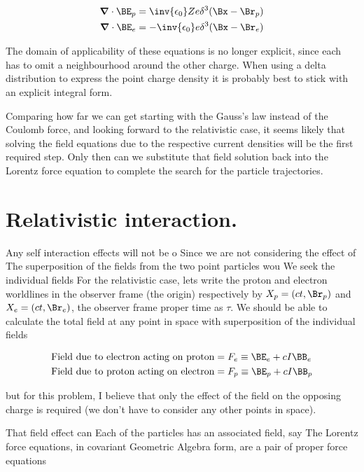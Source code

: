 \begin{align}\label{eqn:nuclearInteraction:boo6}
\spacegrad \cdot \BE_p &= \inv{\epsilon_0} Z e \delta^3(\Bx - \Br_p) \\
\spacegrad \cdot \BE_e &= -\inv{\epsilon_0} e \delta^3(\Bx - \Br_e) 
\end{align}

The domain of applicability of these equations is no longer explicit, since each has to omit a neighbourhood around the other charge.  When using a delta distribution to express the point charge density it is probably best to stick with an explicit integral form.

Comparing how far we can get starting with the Gauss's law instead of the Coulomb force, and looking forward to the relativistic case, it seems likely that solving the field equations due to the respective current densities will be the first required step.  Only then can we substitute that field solution back into the Lorentz force equation to complete the search for the particle trajectories.

\section{Relativistic interaction.}

Any self interaction effects will not be o
Since we are not considering the effect of 
The superposition of the fields from the two point particles wou
We seek the individual fields 
For the relativistic case, lets write the proton and electron worldlines in the observer frame (the origin) respectively by $X_p = (ct, \Br_p)$ and $X_e = (ct,\Br_e)$, the observer frame proper time as $\tau$.  We should be able to calculate the total field at any point in space with superposition of the individual fields

\begin{align}\label{eqn:nuclearInteraction:hoo3}
\text{Field due to electron acting on proton} &= F_e \equiv \BE_e + c I\BB_e \\
\text{Field due to proton acting on electron} &= F_p \equiv \BE_p + c I\BB_p
\end{align}

but for this problem, I believe that only the effect of the field on the opposing charge is required (we don't have to consider any other points in space).

That field effect 
can Each of the particles has an associated field, say
The Lorentz force equations, in covariant Geometric Algebra form, are a pair of proper force equations

